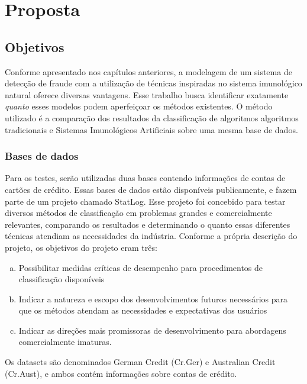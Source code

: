 \chapter{Proposta}

\section{Objetivos}

Conforme apresentado nos capítulos anteriores, a modelagem de um sistema de detecção de fraude com a utilização de técnicas inspiradas no sistema imunológico natural oferece diversas vantagens. Esse trabalho busca identificar exatamente \emph{quanto} esses modelos podem aperfeiçoar os métodos existentes. O método utilizado é a comparação dos resultados da classificação de algoritmos algoritmos tradicionais e Sistemas Imunológicos Artificiais sobre uma mesma base de dados.

\subsection{Bases de dados}

Para os testes, serão utilizadas duas bases contendo informações de contas de cartões de crédito. Essas bases de dados estão disponíveis publicamente, e fazem parte de um projeto chamado StatLog. Esse projeto foi concebido para testar diversos métodos de classificação em problemas grandes e comercialmente relevantes, comparando os resultados e determinando o quanto essas diferentes técnicas atendiam as necessidades da indústria. Conforme a própria descrição do projeto, os objetivos do projeto eram três:

\begin{enumerate}[a)]
    \item Possibilitar medidas críticas de desempenho para procedimentos de classificação disponíveis
    \item Indicar a natureza e escopo dos desenvolvimentos futuros necessários para que os métodos atendam as necessidades e expectativas dos usuários
    \item Indicar as direções mais promissoras de desenvolvimento para abordagens comercialmente imaturas.
\end{enumerate}

Os datasets são denominados German Credit (Cr.Ger) e Australian Credit (Cr.Aust), e ambos contém informações sobre contas de crédito.

